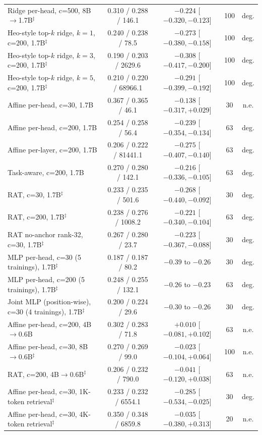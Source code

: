 \documentclass{article} %
\begin{document}
\begin{table}[t]
\begin{tabular}{lcccc}
Ridge per-head, c=500, 8B$\to$1.7B$^\ddagger$ & 0.310 / 0.288 / 146.1 & $-0.224$ [$-0.320, -0.123$] & 100 & deg. \\
Heo-style top-$k$ ridge, $k{=}1$, c=200, 1.7B$^\ddagger$ & 0.240 / 0.238 / 78.5 & $-0.273$ [$-0.380, -0.158$] & 100 & deg. \\
Heo-style top-$k$ ridge, $k{=}3$, c=200, 1.7B$^\ddagger$ & 0.190 / 0.203 / 2629.6 & $-0.308$ [$-0.417, -0.200$] & 100 & deg. \\
Heo-style top-$k$ ridge, $k{=}5$, c=200, 1.7B$^\ddagger$ & 0.210 / 0.220 / 68966.1 & $-0.291$ [$-0.399, -0.192$] & 100 & deg. \\
Affine per-head, c=30, 1.7B & 0.367 / 0.365 / 46.1 & $-0.138$ [$-0.317, +0.029$] & 30 & n.e. \\
Affine per-head, c=200, 1.7B & 0.254 / 0.258 / 56.4 & $-0.239$ [$-0.354, -0.134$] & 63 & deg. \\
Affine per-layer, c=200, 1.7B & 0.206 / 0.222 / 81441.1 & $-0.275$ [$-0.407, -0.140$] & 63 & deg. \\
Task-aware, c=200, 1.7B & 0.270 / 0.280 / 142.1 & $-0.216$ [$-0.336, -0.105$] & 63 & deg. \\
RAT, c=30, 1.7B$^\ddagger$ & 0.233 / 0.235 / 501.6 & $-0.268$ [$-0.440, -0.092$] & 30 & deg. \\
RAT, c=200, 1.7B$^\ddagger$ & 0.238 / 0.276 / 1008.2 & $-0.221$ [$-0.340, -0.104$] & 63 & deg. \\
RAT no-anchor rank-32, c=30, 1.7B$^\ddagger$ & 0.267 / 0.280 / 23.7 & $-0.223$ [$-0.367, -0.088$] & 30 & deg. \\
MLP per-head, c=30 (5 trainings), 1.7B$^\ddagger$ & 0.187 / 0.187 / 80.2 & $-0.39$ to $-0.26$ & 30 & deg. \\
MLP per-head, c=200 (5 trainings), 1.7B$^\ddagger$ & 0.248 / 0.255 / 132.1 & $-0.26$ to $-0.23$ & 63 & deg. \\
Joint MLP (position-wise), c=30 (4 trainings), 1.7B$^\ddagger$ & 0.200 / 0.224 / 29.6 & $-0.30$ to $-0.26$ & 30 & deg. \\
Affine per-head, c=200, 4B$\to$0.6B & 0.302 / 0.283 / 71.8 & $+0.010$ [$-0.081, +0.102$] & 63 & n.e. \\
Affine per-head, c=30, 8B$\to$0.6B$^\ddagger$ & 0.270 / 0.269 / 99.0 & $-0.023$ [$-0.104, +0.064$] & 100 & n.e. \\
RAT, c=200, 4B$\to$0.6B$^\ddagger$ & 0.206 / 0.232 / 790.0 & $-0.041$ [$-0.120, +0.038$] & 63 & n.e. \\
Affine per-head, c=30, 1K-token retrieval$^\ddagger$ & 0.233 / 0.232 / 6554.1 & $-0.285$ [$-0.534, -0.025$] & 30 & deg. \\
Affine per-head, c=30, 4K-token retrieval$^\ddagger$ & 0.350 / 0.348 / 6859.8 & $-0.035$ [$-0.380, +0.313$] & 20 & n.e. \\
\bottomrule
\end{tabular}
\end{table}
\end{document}
